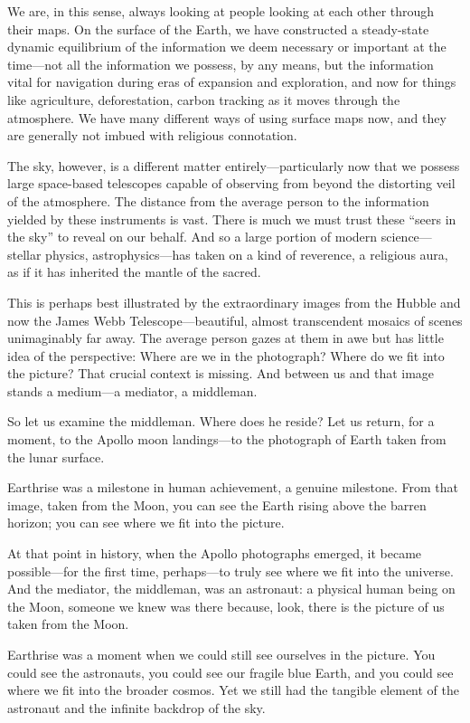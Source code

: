 We are, in this sense, always looking at people looking at each other through their maps. On the surface of the Earth, we have constructed a steady-state dynamic equilibrium of the information we deem necessary or important at the time—not all the information we possess, by any means, but the information vital for navigation during eras of expansion and exploration, and now for things like agriculture, deforestation, carbon tracking as it moves through the atmosphere. We have many different ways of using surface maps now, and they are generally not imbued with religious connotation.

The sky, however, is a different matter entirely—particularly now that we possess large space-based telescopes capable of observing from beyond the distorting veil of the atmosphere. The distance from the average person to the information yielded by these instruments is vast. There is much we must trust these “seers in the sky” to reveal on our behalf. And so a large portion of modern science—stellar physics, astrophysics—has taken on a kind of reverence, a religious aura, as if it has inherited the mantle of the sacred.

This is perhaps best illustrated by the extraordinary images from the Hubble and now the James Webb Telescope—beautiful, almost transcendent mosaics of scenes unimaginably far away. The average person gazes at them in awe but has little idea of the perspective: Where are we in the photograph? Where do we fit into the picture? That crucial context is missing. And between us and that image stands a medium—a mediator, a middleman.

So let us examine the middleman. Where does he reside? Let us return, for a moment, to the Apollo moon landings—to the photograph of Earth taken from the lunar surface.

Earthrise was a milestone in human achievement, a genuine milestone. From that image, taken from the Moon, you can see the Earth rising above the barren horizon; you can see where we fit into the picture.

At that point in history, when the Apollo photographs emerged, it became possible—for the first time, perhaps—to truly see where we fit into the universe. And the mediator, the middleman, was an astronaut: a physical human being on the Moon, someone we knew was there because, look, there is the picture of us taken from the Moon.

Earthrise was a moment when we could still see ourselves in the picture. You could see the astronauts, you could see our fragile blue Earth, and you could see where we fit into the broader cosmos. Yet we still had the tangible element of the astronaut and the infinite backdrop of the sky.

